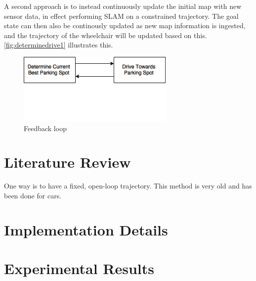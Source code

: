 A second approach is to instead continuously update the initial map with new
sensor data, in effect performing SLAM on a constrained trajectory. The goal
state can then also be continously updated as new map information is ingested,
and the trajectory of the wheelchair will be updated based on this.
\autoref{fig:determinedrive1} illustrates this.
 
\begin{figure} %
\centering
\includegraphics[width=3in]{figures/determinedrive1.png}
\caption{Feedback loop}
\label{fig:determinedrive1}
\end{figure}   %

\section{Literature Review}
\label{sec:backinginlitreview}
One way is to have a fixed, open-loop trajectory. This method is very old and
has been done for cars.

\section{Implementation Details}

\section{Experimental Results}

% 
% 
